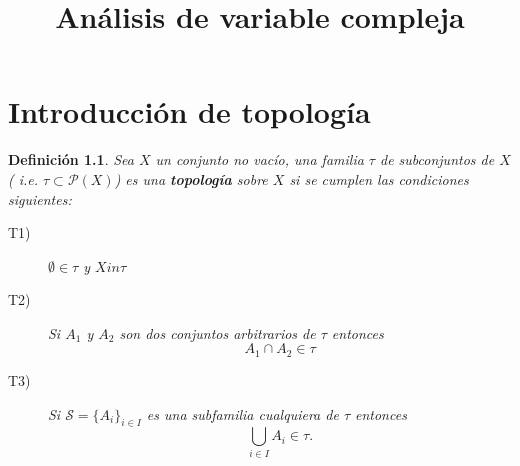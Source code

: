 \documentclass{book}
\title{Análisis de variable compleja}
\newtheorem{defi}{Definición}[chapter]
\begin{document}
\maketitle
\tableofcontents
\begin{comment}
\chapter*{Preámbulo}
\addcontentsline{toc}{chapter}{Preámbulo}
Estos apuntes están destinados a complementar los apuntes tomados por
los estudiantes de la asignatura homónima perteneciente al segundo año del
Grado en Física de la Universidad de Alicante.
Es un texto realizado fundamentalmente a partir de las notas tomadas
durante las lecciones impartidas por el profesor Tijani Pakhrou, del departamento
de Análisis Matemático, durante el curso académico 2021-2022, destinado exclusivamente a estudiantes y sin ánimo de lucro.
No está exento de erratas. La edición de estos apuntes se remite a la fecha de compilación que aparece en la portada. El último tema es el que menos horas hemos echado por falta de las mismas. 

Para obtener una copia del código fuente o para comunicar posibles erratas, o colaborar de cualquier forma para mejorar estos apuntes utilizad el siguiente repositorio de Github: {\color{blue}\url{https://github.com/Oscar015/Analisis-funcional}}

\end{comment}

\chapter{Introducción de topología} 

\begin{defi}
Sea $X$ un conjunto no vacío, una familia $\tau$ de subconjuntos de $X$ ( i.e. $\tau \subset \mathcal{P}(X)$) es una \textbf{topología} sobre $X$ si se cumplen las condiciones siguientes:

\begin{description}
\item[T1)] $\emptyset \in\tau$ y $X in \tau$
\item[T2)] Si $A_1$ y $A_2$ son dos conjuntos arbitrarios de $\tau$ entonces
$$ A_1 \cap A_2 \in\tau$$
\item[T3)] Si $\mathcal{S} = \{A_i\}_{i\in I}$ es una subfamilia cualquiera de $\tau$ entonces
$$ \bigcup_{i\in I}A_i \in \tau.$$
\end{description}
\end{defi}
\end{document}

